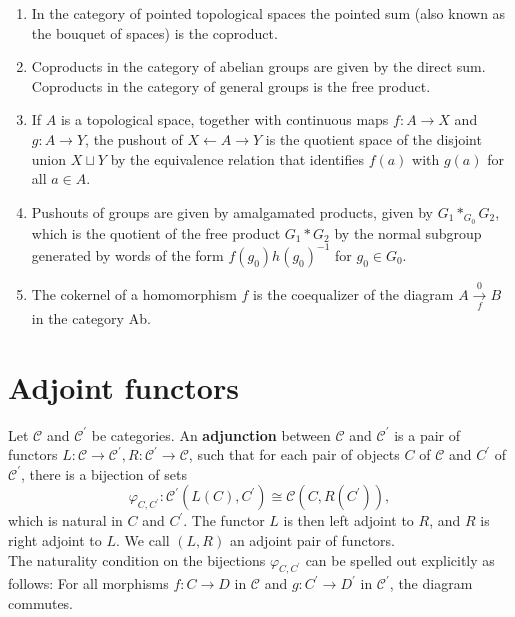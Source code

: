 \begin{example}[Colimits]
\begin{enumerate}
        \item In the category of pointed topological spaces the pointed sum (also known as the bouquet of spaces) is the coproduct.
        \item Coproducts in the category of abelian groups are given by the direct sum. Coproducts in the category of general groups is the free product.
        \item If $A$ is a topological space, together with continuous maps $f: A \rightarrow X$ and $g: A \rightarrow Y$, the pushout of $X \leftarrow A \rightarrow Y$ is the quotient space of the disjoint union $X \sqcup Y$ by the equivalence relation that identifies $f(a)$ with $g(a)$ for all $a \in A$.
        \item Pushouts of groups are given by amalgamated products, given by $G_1 *_{G_0} G_2$, which is the quotient of the free product $G_1 * G_2$ by the normal subgroup generated by words of the form $f\left(g_0\right) h\left(g_0\right)^{-1}$ for $g_0 \in G_0$.
        \item The cokernel of a homomorphism $f$ is the coequalizer of the diagram $A \underset{f}{\stackrel{0 }{\longrightarrow}} B$ in the category Ab.
    \end{enumerate}
\end{example}




\section{Adjoint functors}

Let $\mathcal{C}$ and $\mathcal{C}^{\prime}$ be categories. An \textbf{adjunction} between $\mathcal{C}$ and $\mathcal{C}^{\prime}$ is a pair of functors $L: \mathcal{C} \rightarrow \mathcal{C}^{\prime}, R: \mathcal{C}^{\prime} \rightarrow \mathcal{C}$, such that for each pair of objects $C$ of $\mathcal{C}$ and $C^{\prime}$ of $\mathcal{C}^{\prime}$, there is a bijection of sets
$$
\varphi_{C, C^{\prime}}: \mathcal{C}^{\prime}\left(L(C), C^{\prime}\right) \cong \mathcal{C}\left(C, R\left(C^{\prime}\right)\right),
$$
which is natural in $C$ and $C^{\prime}$.
The functor $L$ is then left adjoint to $R$, and $R$ is right adjoint to $L$. We call $(L, R)$ an adjoint pair of functors.\\
The naturality condition on the bijections $\varphi_{C, C^{\prime}}$ can be spelled out explicitly as follows: For all morphisms $f: C \rightarrow D$ in $\mathcal{C}$ and $g: C^{\prime} \rightarrow D^{\prime}$ in $\mathcal{C}^{\prime}$, the diagram commutes.

